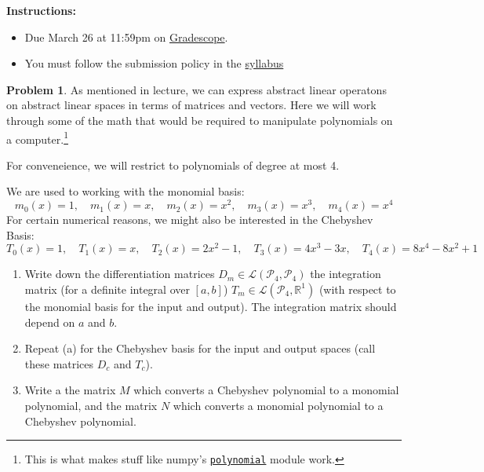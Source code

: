 \documentclass[12pt]{article}
\theoremstyle{definition}
\newtheorem{problem}{Problem}
\begin{document}
\textbf{\Large{}}
    
\vspace{-1.8em}
\hrulefill


\textbf{Instructions:}
    \begin{itemize}
        \item Due March 26 at 11:59pm on \href{https://www.gradescope.com/courses/709136}{Gradescope}.
        \item You must follow the submission policy in the \href{https://courses.chen.pw/la_s2024/syllabus.html}{syllabus} 
\end{itemize}
   
\vspace{.5em}


\begin{problem}
As mentioned in lecture, we can express abstract linear operatons on abstract linear spaces in terms of matrices and vectors. 
Here we will work through some of the math that would be required to manipulate polynomials on a computer.\footnote{This is what makes stuff like numpy's \href{https://numpy.org/doc/stable/reference/routines.polynomials.html}{\texttt{polynomial}} module work.}

For conveneience, we will restrict to polynomials of degree at most 4.

We are used to working with the monomial basis:
\[
m_0(x) = 1, \quad
m_1(x) = x, \quad
m_2(x) = x^2, \quad
m_3(x) = x^3, \quad
m_4(x) = x^4
\]
For certain numerical reasons, we might also be interested in the Chebyshev Basis:
\[
T_0(x) = 1, \quad
T_1(x) = x, \quad
T_2(x) = 2x^2 - 1, \quad
T_3(x) = 4x^3 - 3x, \quad
T_4(x) = 8x^4 - 8x^2 + 1    
\]

\begin{enumerate}
    \item Write down the differentiation matrices $D_m\in \mathcal{L}(\mathcal{P}_4,\mathcal{P}_4)$ the integration matrix (for a definite integral over $[a,b]$) $T_m \in \mathcal{L}(\mathcal{P}_4,\mathbb{R}^1)$ (with respect to the monomial basis for the input and output). The integration matrix should depend on $a$ and $b$.
    \item Repeat (a) for the Chebyshev basis for the input and output spaces (call these matrices $D_c$ and $T_c$).
    \item Write a the matrix $M$ which converts a Chebyshev polynomial to a monomial polynomial, and the matrix $N$ which converts a monomial polynomial to a Chebyshev polynomial. 
\end{enumerate}

    
\end{problem}
\end{document}
